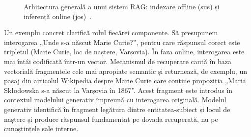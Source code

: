 \begin{figure}[htbp]
    \centering
    \caption{Arhitectura generală a unui sistem RAG: indexare offline (sus) și inferență online (jos)~\cite{gao2024retrievalaugmentedgenerationlargelanguage, karpukhin2020dpr}.}
    \label{fig:rag-arch}
\end{figure}

Un exemplu concret clarifică rolul fiecărei componente. Să presupunem interogarea „Unde s-a născut Marie Curie?”, pentru care răspunsul corect este tripletul (Marie Curie, loc de naștere, Varșovia). În faza online, interogarea este mai întâi codificată într-un vector. Mecanismul de recuperare caută în baza vectorială fragmentele cele mai apropiate semantic și returnează, de exemplu, un pasaj din articolul Wikipedia despre Marie Curie care conține propoziția „Maria Skłodowska s-a născut la Varșovia în 1867”. Acest fragment este introdus în contextul modelului generativ împreună cu interogarea originală. Modelul generativ identifică în fragment legătura dintre entitatea-subiect și locul de naștere și produce răspunsul fundamentat pe dovada recuperată, nu pe cunoștințele sale interne.

